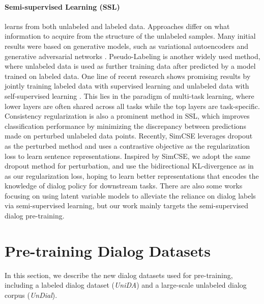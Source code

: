\documentclass[letterpaper]{article} \usepackage{aaai22}  \usepackage{times}  \usepackage{helvet}  \usepackage{courier}  \usepackage[hyphens]{url}  \usepackage{graphicx} \urlstyle{rm} \def\UrlFont{\rm}  \usepackage{natbib}  \usepackage{caption} \DeclareCaptionStyle{ruled}{labelfont=normalfont,labelsep=colon,strut=off} \frenchspacing  \setlength{\pdfpagewidth}{8.5in}  \setlength{\pdfpageheight}{11in}  \usepackage{algorithm}
\begin{document}
\paragraph{Semi-supervised Learning (SSL)} learns from both unlabeled and labeled data. 
Approaches differ on what information to acquire from the structure of the unlabeled samples. Many initial results  were based on generative models, such as variational autoencoders \cite{kingma2019introduction}  and generative adversarial networks \cite{goodfellow2014generative}. Pseudo-Labeling \cite{lee2013pseudo} is another widely used method, where unlabeled data is used as further training data after predicted by a model trained on labeled data. One line of recent research shows promising results by jointly training labeled data with supervised learning and unlabeled data with self-supervised learning \cite{sun2020ernie}. This lies in the paradigm of multi-task learning, where lower layers are often shared across all tasks while the top layers are task-specific. Consistency regularization \cite{verma2019interpolation} is also a prominent method in SSL, which improves classification performance by minimizing the discrepancy between predictions made on perturbed unlabeled data points. Recently, SimCSE \cite{gao2021simcse} leverages dropout as the perturbed method and uses a contrastive objective as the regularization loss to learn sentence representations.
Inspired by SimCSE, we adopt the same dropout method for perturbation, and use the bidirectional KL-divergence as in  \citet{liang2021r} as our regularization loss, hoping to learn better representations that encodes the knowledge of dialog policy for downstream tasks. There are also some works \cite{jin2018explicit, zhang-etal-2020-probabilistic, liu2021variational} focusing on using latent variable models to alleviate the reliance on dialog labels via semi-supervised learning, but our work mainly targets the semi-supervised dialog pre-training.

\section{Pre-training Dialog Datasets}

In this section, we describe the new dialog datasets used for pre-training, including a  labeled dialog dataset (\textit{UniDA}) and a large-scale unlabeled dialog corpus (\textit{UnDial}).
\end{document}
